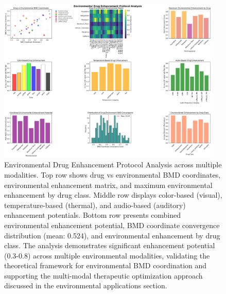 \begin{figure}[htbp]
\centering
\includegraphics[width=0.95\textwidth]{images/environmental_drug_enhancement_20251004_100843.png}
\caption{Environmental Drug Enhancement Protocol Analysis across multiple modalities. Top row shows drug vs environmental BMD coordinates, environmental enhancement matrix, and maximum environmental enhancement by drug class. Middle row displays color-based (visual), temperature-based (thermal), and audio-based (auditory) enhancement potentials. Bottom row presents combined environmental enhancement potential, BMD coordinate convergence distribution (mean: 0.524), and environmental enhancement by drug class. The analysis demonstrates significant enhancement potential (0.3-0.8) across multiple environmental modalities, validating the theoretical framework for environmental BMD coordination and supporting the multi-modal therapeutic optimization approach discussed in the environmental applications section.}
\label{fig:environmental_enhancement}
\end{figure}

